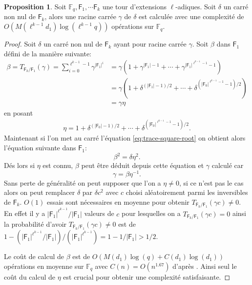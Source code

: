 \documentclass[10pt,a4paper]{book}
\theoremstyle{plain}
\theoremstyle{definition}
\theoremstyle{definition}
\theoremstyle{definition}
\theoremstyle{definition}
\newtheorem{prop}[thm]{Proposition}
\theoremstyle{definition}
\theoremstyle{remark}
\theoremstyle{remark}
\theoremstyle{definition}
\begin{document}
\begin{prop} 
Soit $\mathbb{F}_q, \mathsf{F}_1, \cdots \mathsf{F}_k$ une tour d'extensions 
$\ell$-adiques. Soit $\delta$ un carré non nul de $\mathsf{F}_k$, alors une 
racine carrée $\gamma$ de $\delta$ est calculée avec une complexité de 
$O(M(\ell^{k-1}d_1)\log(\ell^{k-1}q))$ opérations sur $\mathbb{F}_q$. 
\end{prop}

\begin{proof}
Soit $\delta$ un carré non nul de $\mathsf{F}_k$ ayant pour racine carrée $\gamma$. Soit $\beta$ dans $\mathsf{F}_1$ défini de la manière suivante:
\begin{align}
\label{eq:trace-square-root}
\beta=T_{\mathsf{F}_k/\mathsf{F}_1}(\gamma)=\sum_{i=0}^{\ell^{k-1}-1}\gamma^{|\mathsf{F}_1|^i}&=\gamma(1+\gamma^{|\mathsf{F}_1|-1}+\cdots+ \gamma^{|\mathsf{F}_1|^{\ell^{k-1}-1}-1} ) \\
&=\gamma(1+\delta^{(|\mathsf{F}_1|-1)/2}+\cdots+ \delta^{(|\mathsf{F}_0|^{\ell^{k-1}-1}-1)/2}) \\
&=\gamma \eta
\end{align}
en posant 
\begin{align*}
\eta=1+\delta^{(|\mathsf{F}_0|-1)/2}+\cdots+ \delta^{(|\mathsf{F}_0|^{\ell^{k-1}-1}-1)/2}.
\end{align*}
Maintenant si l'on met au carré l'équation \eqref{eq:trace-square-root} on obtient alors l'équation suivante dans $\mathsf{F}_1$: 
\begin{equation*}
\beta^2=\delta \eta^2. 
\end{equation*}
Dés lors si $\eta$ est connu, $\beta$ peut être déduit depuis cette équation et $\gamma$ calculé car
\begin{equation*}
 \gamma=\beta \eta^{-1}.
\end{equation*}
Sans perte de généralité on peut supposer que l'on a $\eta \neq 0$, si ce n'est pas le cas alors on peut remplacer $\delta$ par $\delta c^2$ avec $c$ choisi aléatoirement parmi les inversibles de $\mathsf{F}_k$.
$O(1)$ essais sont nécessaires en moyenne pour obtenir $T_{\mathsf{F}_k/\mathsf{F}_1}(\gamma c) \neq 0$. En effet il y a $|\mathsf{F}_1|^{\ell^{k-1}}/|\mathsf{F}_1|$ valeurs de $c$ pour lesquelles on a $T_{\mathsf{F}_k/\mathsf{F}_1}(\gamma c) = 0$ ainsi la probabilité d'avoir $T_{\mathsf{F}_k/\mathsf{F}_1}(\gamma c) \neq 0$ est de $1-(|\mathsf{F}_1|^{\ell^{k-1}}/|\mathsf{F}_1|)/(|\mathsf{F}_1|^{\ell^{k-1}})=1-1/|\mathsf{F}_1|>1/2$.

Le coût de calcul de $\beta$ est de $O(M(d_1)\log(q)+C(d_1)\log(d_1))$ opérations en moyenne sur $\mathbb{F}_q$ avec $C(n)=O(n^{1.67})$ d'après \cite{Doliskani-Schost14}. Ainsi seul le coût du calcul de $\eta$ est crucial pour obtenir une complexité satisfaisante.


\end{proof}
\end{document}
